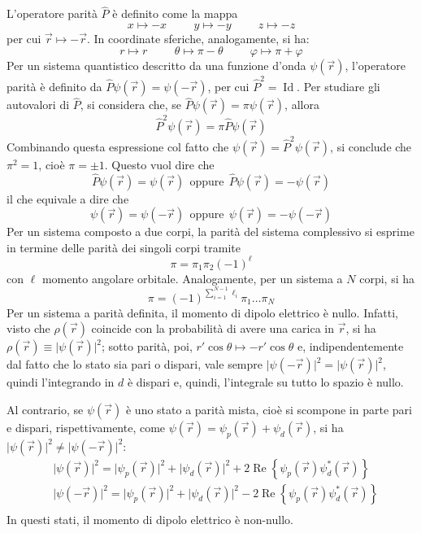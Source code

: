 \documentclass[11pt, a4paper]{scrartcl}
\theoremstyle{style}
\numberwithin{equation}{subsection}
\begin{document}
L'operatore parit\`a $\hat{P}$ \`e definito come la mappa
\[
x \mapsto -x \hspace{1cm} y \mapsto -y \hspace{1cm} z \mapsto -z
\] 
per cui $\vec{r} \mapsto -\vec{r}$.
In coordinate sferiche, analogamente, si ha:
\[
r \mapsto r \hspace{1cm} \theta  \mapsto \pi - \theta  \hspace{1cm} \varphi  \mapsto \pi + \varphi 
\] 
Per un sistema quantistico descritto da una funzione d'onda $\psi (\vec{r})$, l'operatore parit\`a \`e definito da $\hat{P} \psi (\vec{r}) = \psi (-\vec{r})$, per cui $\hat{P}^2 = \operatorname{Id} $.
Per studiare gli autovalori di $\hat{P}$, si considera che, se $\hat{P} \psi (\vec{r}) = \pi \psi (\vec{r})$, allora 
\[
\hat{P}^2 \psi (\vec{r}) = \pi \hat{P}\psi (\vec{r})
\] 
Combinando questa espressione col fatto che $\psi (\vec{r}) = \hat{P}^2 \psi (\vec{r})$, si conclude che $\pi^2 = 1$, cio\`e $\pi= \pm 1$.
Questo vuol dire che 
\[
\hat{P} \psi (\vec{r}) = \psi (\vec{r})\ \  \text{oppure} \ \  \hat{P} \psi (\vec{r}) = - \psi (\vec{r})
\] 
il che equivale a dire che 
\[
\psi (\vec{r}) = \psi (-\vec{r}) \ \ \text{oppure} \ \ \psi (\vec{r}) = - \psi (-\vec{r})
\] 
Per un sistema composto a due corpi, la parit\`a del sistema complessivo si esprime in termine delle parit\`a dei singoli corpi tramite 
\[
\pi = \pi_1 \pi_2 (-1)^{\ell }
\] 
con $\ell $ momento angolare orbitale.
Analogamente, per un sistema a $N$ corpi, si ha
\[
\pi = (-1)^{\sum_{i=1}^{N-1} \ell _i} \pi_1 \ldots \pi_N
\] 
Per un sistema a parit\`a definita, il momento di dipolo elettrico \`e nullo.
Infatti, visto che $\rho (\vec{r})$ coincide con la probabilit\`a di avere una carica in $\vec{r}$, si ha $\rho (\vec{r}) \equiv \lvert \psi (\vec{r}) \rvert ^2$; sotto parit\`a, poi, $r' \cos \theta  \mapsto -r' \cos \theta $ e, indipendentemente dal fatto che lo stato sia pari o dispari, vale sempre $\lvert \psi (-\vec{r}) \rvert ^2 = \lvert \psi (\vec{r}) \rvert ^2$, quindi l'integrando in $d$ \`e dispari e, quindi, l'integrale su tutto lo spazio \`e nullo.

Al contrario, se $\psi (\vec{r})$ \`e uno stato a parit\`a mista, cio\`e si scompone in parte pari e dispari, rispettivamente, come $\psi (\vec{r}) = \psi _p(\vec{r}) + \psi _d(\vec{r})$, si ha $\lvert \psi (\vec{r}) \rvert ^2 \neq \lvert \psi (-\vec{r}) \rvert^2 $:
\[
\begin{split}
	&\lvert \psi (\vec{r}) \rvert ^2 = \lvert \psi _p(\vec{r}) \rvert ^2 + \lvert \psi _d(\vec{r}) \rvert ^2 + 2 \operatorname{Re} \left\{ \psi _p(\vec{r}) \psi _d^*(\vec{r}) \right\} \\
	&\lvert \psi (-\vec{r}) \rvert ^2 = \lvert \psi _p(\vec{r}) \rvert ^2 + \lvert \psi _d(\vec{r}) \rvert ^2 - 2 \operatorname{Re} \left\{ \psi _p(\vec{r}) \psi _d^*(\vec{r}) \right\} \\
\end{split}
\] 
In questi stati, il momento di dipolo elettrico \`e non-nullo.
\end{document}
